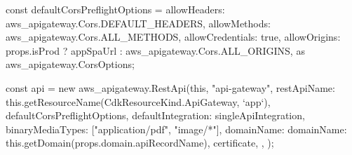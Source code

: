 const defaultCorsPreflightOptions = {
			allowHeaders: aws_apigateway.Cors.DEFAULT_HEADERS,
			allowMethods: aws_apigateway.Cors.ALL_METHODS,
			allowCredentials: true,
			allowOrigins: props.isProd ? appSpaUrl : aws_apigateway.Cors.ALL_ORIGINS,
		} as aws_apigateway.CorsOptions;

const api = new aws_apigateway.RestApi(this, "api-gateway", {
    restApiName: this.getResourceName(CdkResourceKind.ApiGateway, `app`),
    defaultCorsPreflightOptions,
    defaultIntegration: singleApiIntegration,
    binaryMediaTypes: ["application/pdf", "image/*"],
    domainName: {
        domainName: this.getDomain(props.domain.apiRecordName),
        certificate,
    },
});